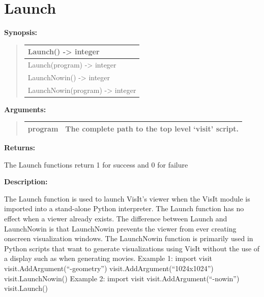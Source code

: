 \documentclass[letterpaper,10pt,english]{sphinxmanual}
\begin{document}
\section{Launch}
\label{functions:launch}
\begin{DUlineblock}{0em}
\item[] \textbf{Synopsis:}
\end{DUlineblock}
\begin{quote}

\begin{tabulary}{\linewidth}{|L|}
\hline

Launch() -\textgreater{} integer
\\
\hline
Launch(program) -\textgreater{} integer
\\
\hline
LaunchNowin() -\textgreater{} integer
\\
\hline
LaunchNowin(program) -\textgreater{} integer
\\
\hline\end{tabulary}

\end{quote}

\begin{DUlineblock}{0em}
\item[] 
\item[] \textbf{Arguments:}
\end{DUlineblock}
\begin{quote}

\begin{tabulary}{\linewidth}{|L|L|}
\hline

program
 & 
The complete path to the top level `visit' script.
\\
\hline\end{tabulary}

\end{quote}

\begin{DUlineblock}{0em}
\item[] 
\item[] \textbf{Returns:}
\item[] The Launch functions return 1 for success and 0 for failure
\item[] 
\item[] \textbf{Description:}
\item[] The Launch function is used to launch VisIt's viewer when the VisIt module
is imported into a stand-alone Python interpreter. The Launch function has
no effect when a viewer already exists. The difference between Launch and
LaunchNowin is that LaunchNowin prevents the viewer from ever creating
onscreen visualization windows. The LaunchNowin function is primarily used
in Python scripts that want to generate visualizations using VisIt without
the use of a display such as when generating movies.
Example 1:
import visit
visit.AddArgument(``-geometry'')
visit.AddArgument(``1024x1024'')
visit.LaunchNowin()
Example 2:
import visit
visit.AddArgument(``-nowin'')
visit.Launch()
\end{DUlineblock}
\end{document}
